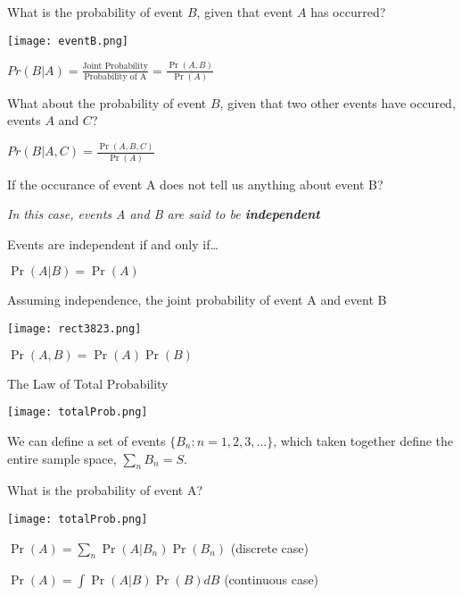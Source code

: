 \documentclass[ignorenonframetext,]{beamer}
\begin{document}
\begin{frame}{What is the probability of event \(B\), given that event
\(A\) has occurred?}

\texttt{[image: eventB.png]}

\(Pr(B|A) = \frac{\text{Joint Probability}}{\text{Probability of A}}=\frac{\Pr(A,B)} {\Pr(A)}\)

\end{frame}

\begin{frame}{What about the probability of event \(B\), given that two
other events have occured, events \(A\) and \(C\)?}

\(Pr(B|A,C) = \frac{\Pr(A,B,C)} {\Pr(A)}\)

\end{frame}

\begin{frame}{If the occurance of event A does not tell us anything
about event B?}

\emph{In this case, events A and B are said to be \textbf{independent}}

\end{frame}

\begin{frame}{Events are independent if and only if\ldots{}}

\(\Pr(A|B) = \Pr(A)\)

\end{frame}

\begin{frame}{Assuming independence, the joint probability of event A
and event B}

\texttt{[image: rect3823.png]}

\(\Pr(A,B) = \Pr(A) \Pr(B)\)

\end{frame}

\begin{frame}{The Law of Total Probability}

\texttt{[image: totalProb.png]}

We can define a set of events \(\{B_n : n = 1,2,3,...\}\), which taken
together define the entire sample space, \(\sum_n B_n = S\).

\end{frame}

\begin{frame}{What is the probability of event A?}

\texttt{[image: totalProb.png]}

\(\Pr(A) = \sum_n \Pr(A|B_n)\Pr(B_n)\) (discrete case)

\(\Pr(A) = \int \Pr(A|B)\Pr(B) dB\) (continuous case)

\end{frame}
\end{document}
